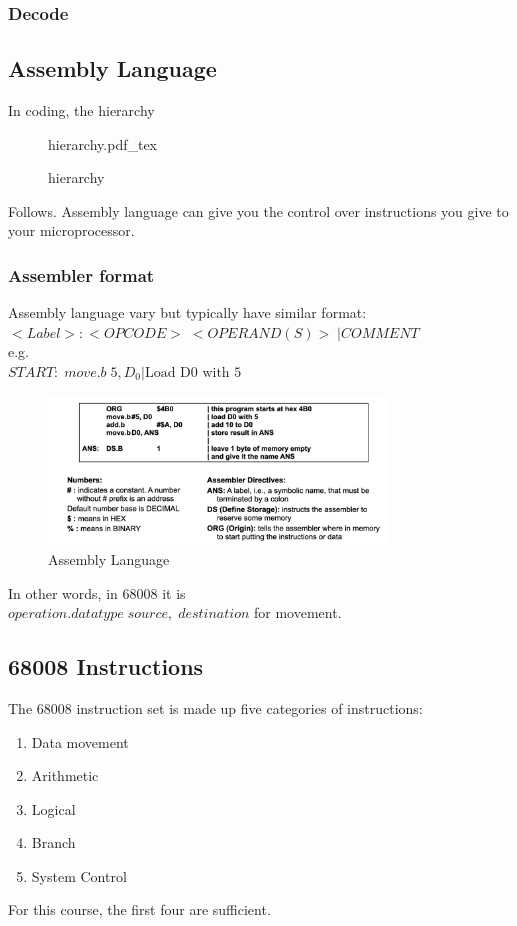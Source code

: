 \documentclass[a4paper]{article}
\newcommand{\incfig}[2][1]{%
    \def\svgwidth{#1\columnwidth}
    {#2.pdf_tex}
}
\theoremstyle{plain}
\theoremstyle{definition}
\theoremstyle{remark}
\begin{document}
\subsubsection{Decode}

\subsection{Assembly Language}
In coding, the hierarchy
\begin{figure}[ht]
    \centering
    \incfig{hierarchy}
    \caption{hierarchy}
    \label{fig:hierarchy}
\end{figure}
Follows. Assembly language can give you the control over instructions you give to your microprocessor. 
\subsubsection{Assembler format}
Assembly language vary but typically have similar format:\\
$<Label>:<OPCODE> \; <OPERAND(S)> \; | COMMENT$\\
e.g.\\
$START: \; move.b \; 5,D_0 |\text{Load D0 with 5}$
\begin{figure}[H]
	\centering
	\includegraphics[width=0.8\textwidth]{figures/assem.png}
	\caption{Assembly Language}
	\label{fig:figures-assem-png}
\end{figure}
In other words, in $68008$ it is \\
$operation.datatype \; source, \;destination$ for movement.
\subsection{68008 Instructions}
The $68008$ instruction set is made up five categories of instructions:
\begin{enumerate}
	\item Data movement
	\item Arithmetic
	\item Logical
	\item Branch
	\item System Control
\end{enumerate}
For this course, the first four are sufficient.
\end{document}
